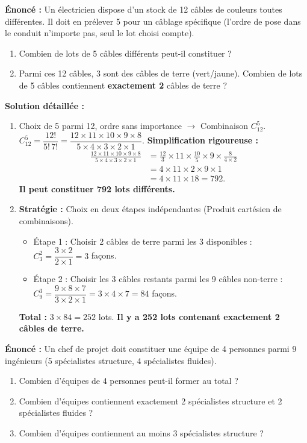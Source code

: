 \documentclass[11pt]{article}
\begin{document}
\begin{exoresolu}
\textbf{Énoncé :} Un électricien dispose d'un stock de 12 câbles de couleurs toutes différentes. Il doit en prélever 5 pour un câblage spécifique (l'ordre de pose dans le conduit n'importe pas, seul le lot choisi compte).
\begin{enumerate}
    \item Combien de lots de 5 câbles différents peut-il constituer ?
    \item Parmi ces 12 câbles, 3 sont des câbles de terre (vert/jaune). Combien de lots de 5 câbles contiennent \textbf{exactement 2} câbles de terre ?
\end{enumerate}
\tcblower
\textbf{Solution détaillée :}
\begin{enumerate}
    \item Choix de 5 parmi 12, ordre sans importance $\rightarrow$ Combinaison $C_{12}^5$.
    $C_{12}^5 = \dfrac{12!}{5!\,7!} = \dfrac{12 \times 11 \times 10 \times 9 \times 8}{5 \times 4 \times 3 \times 2 \times 1}$.
    \textbf{Simplification rigoureuse :}
    \begin{align*}
    \frac{12 \times 11 \times 10 \times 9 \times 8}{5 \times 4 \times 3 \times 2 \times 1}
    &= \frac{12}{3} \times 11 \times \frac{10}{5} \times 9 \times \frac{8}{4 \times 2} \\
    &= 4 \times 11 \times 2 \times 9 \times 1 \\
    &= 4 \times 11 \times 18 = 792.
    \end{align*}
    \textbf{Il peut constituer 792 lots différents.}
    \item \textbf{Stratégie :} Choix en deux étapes indépendantes (Produit cartésien de combinaisons).
    \begin{itemize}
        \item Étape 1 : Choisir 2 câbles de terre parmi les 3 disponibles : $C_3^2 = \dfrac{3 \times 2}{2 \times 1} = 3$ façons.
        \item Étape 2 : Choisir les 3 câbles restants parmi les 9 câbles non-terre : $C_9^3 = \dfrac{9 \times 8 \times 7}{3 \times 2 \times 1} = 3 \times 4 \times 7 = 84$ façons.
    \end{itemize}
    \textbf{Total :} $3 \times 84 = 252$ lots.
    \textbf{Il y a 252 lots contenant exactement 2 câbles de terre.}
\end{enumerate}
\end{exoresolu}

\begin{exercice}
\textbf{Énoncé :} Un chef de projet doit constituer une équipe de 4 personnes parmi 9 ingénieurs (5 spécialistes structure, 4 spécialistes fluides).
\begin{enumerate}
    \item Combien d'équipes de 4 personnes peut-il former au total ?
    \item Combien d'équipes contiennent exactement 2 spécialistes structure et 2 spécialistes fluides ?
    \item Combien d'équipes contiennent au moins 3 spécialistes structure ?
\end{enumerate}
\end{exercice}
\end{document}
